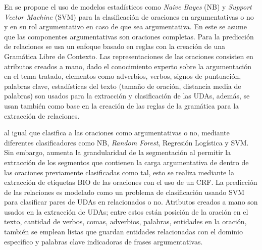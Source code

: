 En \textcite{palau2009argumentation} se propone
el uso de modelos estadísticos como \emph{Naive Bayes} (NB) y \emph{Support Vector Machine} (SVM) 
para la clasificación de 
oraciones en argumentativas o no y en su rol argumentativo en caso de que sea argumentativa. En este
se asume que las componentes argumentativas son oraciones completas. Para la predicción de relaciones
se usa un enfoque basado en reglas con la creación de una Gramática Libre de Contexto. Las representaciones
de las oraciones consisten en atributos creados a mano, dado el conocimiento experto sobre la argumentación
en el tema tratado, elementos como adverbios, verbos, signos de puntuación, palabras clave, estadísticas del texto
(tamaño de oración, distancia media de palabras) son usados para la extracción y clasificación de las UDAs, además,
se usan también como base en la creación de las reglas de la gramática para la extracción de relaciones.

\textcite{goudas2015argument} al igual que \textcite{palau2009argumentation} clasifica a las oraciones como
argumentativas o no, mediante diferentes clasificadores como NB, \emph{Random Forest}, Regresión
Logística y SVM. Sin embargo, \textcite{goudas2015argument} aumenta la grandularidad de la segmentación al permitir
la extracción de los segmentos que contienen la carga argumentativa de dentro de las oraciones previamente clasificadas
como tal, esto se realiza mediante la extracción de etiquetas BIO de las oraciones con el uso de un 
CRF. La predicción de las relaciones es modelado como un problema de clasificación
usando SVM para clasificar pares de UDAs en relacionados o no. Atributos creados a mano 
son usados en la extracción de UDAs; entre estos están posición de la oración en el texto, cantidad de verbos, comas, adverbios,
palabras, entidades en la oración, también se emplean listas que guardan entidades relacionadas con el dominio 
específico y palabras clave indicadoras de frases argumentativas. 

